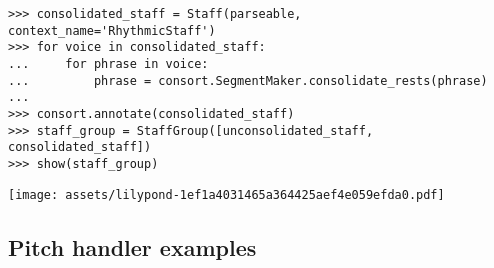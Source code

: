 \begin{comment}
<abjad>
consolidated_staff = Staff(parseable, context_name='RhythmicStaff')
for voice in consolidated_staff:
    for phrase in voice:
        phrase = consort.SegmentMaker.consolidate_rests(phrase)

consort.annotate(consolidated_staff)
staff_group = StaffGroup([unconsolidated_staff, consolidated_staff])
show(staff_group)
</abjad>
\end{comment}

\begin{singlespacing}
\vspace{-0.5\baselineskip}
\begin{lstlisting}
>>> consolidated_staff = Staff(parseable, context_name='RhythmicStaff')
>>> for voice in consolidated_staff:
...     for phrase in voice:
...         phrase = consort.SegmentMaker.consolidate_rests(phrase)
...
>>> consort.annotate(consolidated_staff)
>>> staff_group = StaffGroup([unconsolidated_staff, consolidated_staff])
>>> show(staff_group)
\end{lstlisting}
\noindent\texttt{[image: assets/lilypond-1ef1a4031465a364425aef4e059efda0.pdf]}
\end{singlespacing}

\subsection{Pitch handler examples}

\begin{comment}
<abjad>[stylesheet=../consort.ily]
segment_maker = consort.SegmentMaker(
    desired_duration_in_seconds=9,
    omit_stylesheets=True,
    permitted_time_signatures=[(3, 4)],
    score_template=templatetools.GroupedStavesScoreTemplate(
        staff_count=2,
        ),
    tempo=indicatortools.Tempo((1, 4), 60),
    )
music_specifier = consort.MusicSpecifier(
    rhythm_maker=rhythmmakertools.TaleaRhythmMaker(
        talea=rhythmmakertools.Talea([1], 16),
        ),
    )
timespan_maker = consort.TaleaTimespanMaker(
    initial_silence_talea=rhythmmakertools.Talea([0, 1], 4),
    playing_talea=rhythmmakertools.Talea([1], 8),
    playing_groupings=[3],
    silence_talea=rhythmmakertools.Talea([1], 8),
    )
segment_maker.add_setting(
    timespan_maker=timespan_maker,
    v1=music_specifier,
    v2=music_specifier,
    )
show(segment_maker, verbose=False)
</abjad>
\end{comment}

